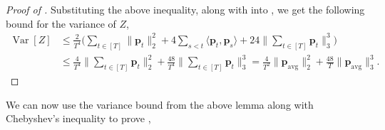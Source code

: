 \documentclass[10pt]{article} %
\theoremstyle{plain}
\newcommand{\bp}{\textbf{p}}
\newcommand{\avg}{\mathrm{avg}}
\newcommand{\Var}{\operatorname{{Var}}}
\begin{document}
\begin{proof}[Proof of ]
	
	Substituting the above inequality, along with  into , we get the following bound for the variance of $Z$,
	\begin{align}\label{eq:thm1vb}
		\Var[Z] &\le \frac{2}{T^4}\Big(\sum_{t \in [T]} \|\bp_t\|^2_2 + 4\sum_{s < t}\langle \bp_t, \bp_{s}\rangle + 24 \Big\| \sum_{t \in [T]}\bp_t\Big\|^3_3\Big) \nonumber\\
		&\le \frac{4}{T^4}\Big\| \sum_{t \in [T]} \bp_t \Big\|^2_2 + \frac{48}{T^4}\Big\| \sum_{t \in [T]}\bp_t\Big\|^3_3
		= \frac{4}{T^2}\Big\| \bp_{\avg} \Big\|^2_2 + \frac{48}{T}\Big\| \bp_{\avg}\Big\|^3_3.
	\end{align}
\end{proof}

We can now use the variance bound from the above lemma along with Chebyshev's inequality to prove ,
\end{document}
